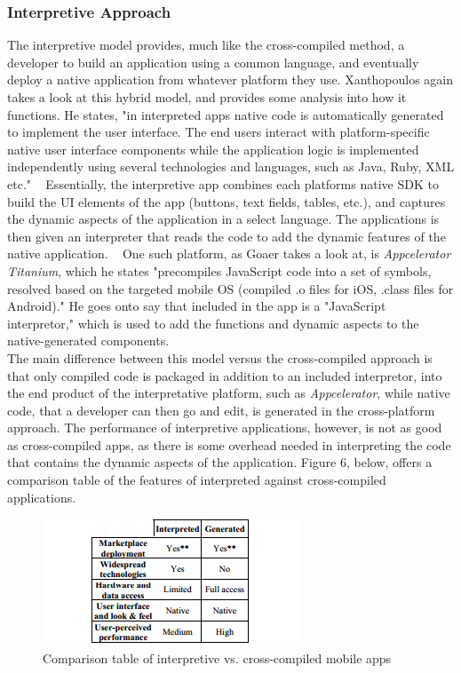 \documentclass[11pt, twocolumn]{article}
\begin{document}
\subsubsection{Interpretive Approach}
The interpretive model provides, much like the cross-compiled method, a developer to build an application using a common language, and eventually deploy a native application from whatever platform they use.  Xanthopoulos again takes a look at this hybrid model, and provides some analysis into how it functions.  He states, "in interpreted apps native code is automatically generated to implement the user interface. The end users interact with platform-specific native user interface components while the application logic is implemented independently using several technologies and languages, such as Java, Ruby, XML etc." ~\cite{Xanthopoulos2013} Essentially, the interpretive app combines each platforms native SDK to build the UI elements of the app (buttons, text fields, tables, etc.), and captures the dynamic aspects of the application in a select language.  The applications is then given an interpreter that reads the code to add the dynamic features of the native application. ~\cite{Goaer2013}  One such platform, as Goaer takes a look at, is {\it Appcelerator Titanium}, which he states "precompiles JavaScript code into a set of symbols, resolved based on the targeted mobile OS (compiled .o files for iOS, .class files for Android)."  He goes onto say that included in the app is a "JavaScript interpretor," which is used to add the functions and dynamic aspects to the native-generated components.  ~\cite{Xanthopoulos2013} \\

The main difference between this model versus the cross-compiled approach is that only compiled code is packaged in addition to an included interpretor, into the end product of the interpretative platform, such as {\it Appcelerator}, while native code, that a developer can then go and edit, is generated in the cross-platform approach.  The performance of interpretive applications, however, is not as good as cross-compiled apps, as there is some overhead needed in interpreting the code that contains the dynamic aspects of the application.  Figure 6, below, offers a comparison table of the features of interpreted against cross-compiled applications.\\

\begin{figure}[h!]
\includegraphics[scale=1.15]{int-vs-cc}
\caption{Comparison table of interpretive vs. cross-compiled mobile apps ~\cite{Xanthopoulos2013}}
\end{figure}
\end{document}
